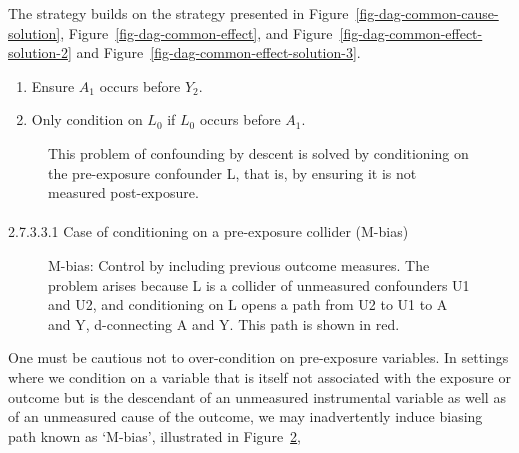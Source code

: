 \documentclass[
  singlecolumn]{article}
\makeatletter
\let\oldparagraph\paragraph
\renewcommand{\paragraph}{
    \@ifstar
      \xxxParagraphStar
      \xxxParagraphNoStar
  }
\newcommand{\xxxParagraphStar}[1]{\oldparagraph*{#1}\mbox{}}
\newcommand{\xxxParagraphNoStar}[1]{\oldparagraph{#1}\mbox{}}
\providecommand{\tightlist}{%
  \setlength{\itemsep}{0pt}\setlength{\parskip}{0pt}}\usepackage{longtable,booktabs,array}
\makeatother
\begin{document}
The strategy builds on the strategy presented in
Figure~\ref{fig-dag-common-cause-solution},
Figure~\ref{fig-dag-common-effect}, and
Figure~\ref{fig-dag-common-effect-solution-2} and
Figure~\ref{fig-dag-common-effect-solution-3}.

\begin{enumerate}
\def\labelenumi{\arabic{enumi}.}
\tightlist
\item
  Ensure \(A_1\) occurs before \(Y_2\).
\item
  Only condition on \(L_0\) if \(L_0\) occurs before \(A_1\).
\end{enumerate}

\begin{figure}


\caption{\label{fig-dag-descendant-solution}This problem of confounding
by descent is solved by conditioning on the pre-exposure confounder L,
that is, by ensuring it is not measured post-exposure.}

\end{figure}%

\paragraph{2.7.3.3.1 Case of conditioning on a pre-exposure collider
(M-bias)}\label{case-of-conditioning-on-a-pre-exposure-collider-m-bias}

\begin{figure}


\caption{\label{fig-m-bias}M-bias: Control by including previous outcome
measures. The problem arises because L is a collider of unmeasured
confounders U1 and U2, and conditioning on L opens a path from U2 to U1
to A and Y, d-connecting A and Y. This path is shown in red.}

\end{figure}%

One must be cautious not to over-condition on pre-exposure variables. In
settings where we condition on a variable that is itself not associated
with the exposure or outcome but is the descendant of an unmeasured
instrumental variable as well as of an unmeasured cause of the outcome,
we may inadvertently induce biasing path known as `M-bias', illustrated
in Figure~\ref{fig-m-bias},
\end{document}
